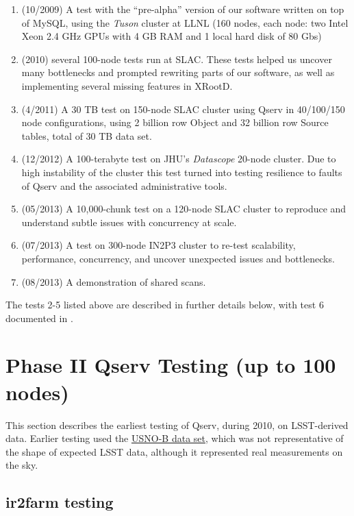 \documentclass[DM,toc]{lsstdoc}
\begin{document}
\begin{enumerate}
\def\labelenumi{\arabic{enumi}.}
\item
  (10/2009) A test with the ``pre-alpha'' version of our software
  written on top of MySQL, using the \emph{Tuson} cluster at LLNL (160
  nodes, each node: two Intel Xeon 2.4 GHz GPUs with 4 GB RAM and 1
  local hard disk of 80 Gbs)
\item
  (2010) several 100-node tests run at SLAC. These tests helped
  us uncover many bottlenecks and prompted rewriting parts of our
  software, as well as implementing several missing features in
  XRootD.
\item
  (4/2011) A 30 TB test on 150-node SLAC cluster using Qserv in
  40/100/150 node configurations, using 2 billion row Object and 32
  billion row Source tables, total of 30 TB data set.
\item
  (12/2012) A 100-terabyte test on JHU's \emph{Datascope} 20-node
  cluster. Due to high instability of the cluster this test turned into
  testing resilience to faults of Qserv and the associated
  administrative tools.
\item
  (05/2013) A 10,000-chunk test on a 120-node SLAC cluster to reproduce
  and understand subtle issues with concurrency at scale.
\item
  (07/2013) A test on 300-node IN2P3 cluster to re-test scalability,
  performance, concurrency, and uncover unexpected issues and
  bottlenecks.
\item
  (08/2013) A demonstration of shared scans.
\end{enumerate}

The tests 2-5 listed above are described in further details below, with test 6 documented in .

\section{Phase II Qserv Testing (up to 100
nodes)}\label{phase-ii-qserv-testing-up-to-100-nodes}

This section describes the earliest testing of Qserv, during 2010, on LSST-derived data.
Earlier testing used the
\href{http://www.nofs.navy.mil/data/fchpix/}{USNO-B data set}, which was
not representative of the shape of expected LSST data, although it
represented real measurements on the sky.

\subsection{ir2farm testing}\label{ir2farm-testing}
\end{document}
